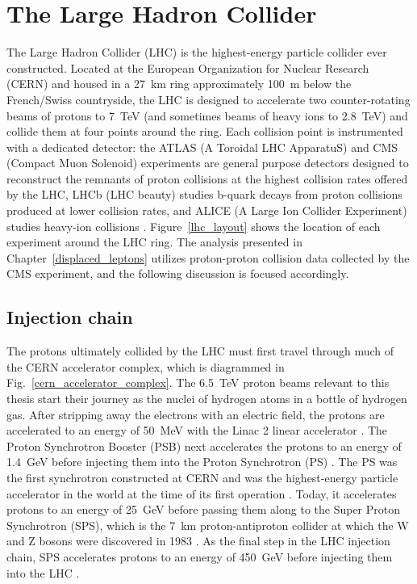 \section{The Large Hadron Collider}
The Large Hadron Collider (LHC) is the highest-energy particle collider ever constructed. Located at the European Organization for Nuclear Research (CERN) and housed in a \SI{27}{\km} ring approximately \SI{100}{\m} below the French/Swiss countryside, the LHC is designed to accelerate two counter-rotating beams of protons to \SI{7}{\TeV} (and sometimes beams of heavy ions to \SI{2.8}{\TeV}) and collide them at four points around the ring. Each collision point is instrumented with a dedicated detector: the ATLAS (A Toroidal LHC ApparatuS) and CMS (Compact Muon Solenoid) experiments are general purpose detectors designed to reconstruct the remnants of proton collisions at the highest collision rates offered by the LHC, LHCb (LHC beauty) studies b-quark decays from proton collisions produced at lower collision rates, and ALICE (A Large Ion Collider Experiment) studies heavy-ion collisions \cite{lhc_machine}. Figure~\ref{lhc_layout} shows the location of each experiment around the LHC ring. The analysis presented in Chapter~\ref{displaced_leptons} utilizes proton-proton collision data collected by the CMS experiment, and the following discussion is focused accordingly.



\subsection{Injection chain}
The protons ultimately collided by the LHC must first travel through much of the CERN accelerator complex, which is diagrammed in Fig.~\ref{cern_accelerator_complex}. The \SI{6.5}{\TeV} proton beams relevant to this thesis start their journey as the nuclei of hydrogen atoms in a bottle of hydrogen gas. After stripping away the electrons with an electric field, the protons are accelerated to an energy of \SI{50}{\MeV} with the Linac 2 linear accelerator \cite{linac2}. The Proton Synchrotron Booster (PSB) next accelerates the protons to an energy of \SI{1.4}{\GeV} before injecting them into the Proton Synchrotron (PS) \cite{psb}. The PS was the first synchrotron constructed at CERN and was the highest-energy particle accelerator in the world at the time of its first operation \cite{cern_annual_report_1959}. Today, it accelerates protons to an energy of \SI{25}{GeV} before passing them along to the Super Proton Synchrotron (SPS), which is the \SI{7}{\km} proton-antiproton collider at which the W and Z bosons were discovered in 1983 \cite{sps}. As the final step in the LHC injection chain, SPS accelerates protons to an energy of \SI{450}{\GeV} before injecting them into the LHC \cite{lhc_machine}.

